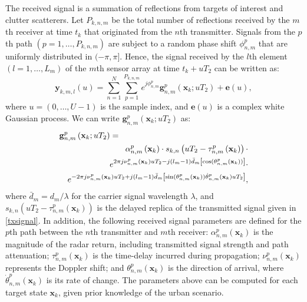 \documentclass[times]{asjcauth}
\begin{document}
The received signal is a summation of reflections from targets of interest and clutter scatterers. Let $P_{k,n,m}$ be the total number of reflections received by the $m$th receiver at time $t_{k}$ that originated from the $n$th transmitter. Signals from the $p$th path $(p = 1,\ldots,P_{k,n,m})$ are subject to a random phase shift $\phi_{n,m}^{p}$ that are uniformly distributed in $(-\pi,\pi]$. Hence, the signal received by the $l$th element $(l = 1,\ldots,L_{m})$ of the $m$th sensor array at time $t_{k} + uT_{2}$ can be written as:
\begin{equation}\label{rxsignal}
\mathbf{y}_{k,m,l}(u) = \sum_{n=1}^{N}\sum_{p =
1}^{P_{k,n,m}}e^{j\phi_{n,m}^{p}}\mathbf{g}_{n,m}^{p}\left(\mathbf{x}_{k};uT_{2}\right)
+\mathbf{e}(u),
\end{equation}
\noindent where $u = (0,\ldots,U-1)$ is the sample index, and $\mathbf{e}(u)$ is a complex white Gaussian process. We can write $\mathbf{g}_{n,m}^{p}\left(\mathbf{x}_{k};uT_{2}\right)$ as:
\begin{eqnarray}\label{eqng}
\lefteqn{\mathbf{g}_{n,m}^{p}\left(\mathbf{x}_{k};uT_{2}\right)=}\\ \nonumber
& &\alpha_{n,m}^{p}\left(\mathbf{x}_{k}\right)\cdot s_{k,n}\left(uT_{2} - \tau_{n,m}^{p}\left(\mathbf{x}_{k}\right)\right)\cdot \\ \nonumber
& &e^{2\pi
j\nu_{n,m}^{p}\left(\mathbf{x}_{k}\right)uT_{2}-j(l_{m}-1)\bar{d}_{m}\left[\cos(\theta_{n,m}^{p}\left(\mathbf{x}_{k}\right))\right]} \cdot\\ \nonumber
& &e^{-2\pi
j\nu_{n,m}^{p}\left(\mathbf{x}_{k}\right)uT_{2}+j(l_{m}-1)\bar{d}_{m}\left[\sin(\theta_{n,m}^{p}\left(\mathbf{x}_{k}\right))\dot{\theta}_{n,m}^{p}\left(\mathbf{x}_{k}\right)uT_{2}\right]},
\end{eqnarray}
\noindent where $\bar{d}_{m} = d_{m}/\lambda$ for the carrier signal wavelength $\lambda$, and $s_{k,n}\left(uT_{2} -
\tau_{n,m}^{p}\left(\mathbf{x}_{k}\right)\right)$ is the delayed replica of the transmitted signal given in \eqref{txsignal}. In addition, the following received signal parameters are defined for the $p$th path between the $n$th transmitter and $m$th receiver: $\alpha_{n,m}^{p}\left(\mathbf{x}_{k}\right)$ is the magnitude of the radar return, including transmitted signal strength and path attenuation; $\tau_{n,m}^{p}\left(\mathbf{x}_{k}\right)$ is the time-delay incurred during propagation; $\nu_{n,m}^{p}\left(\mathbf{x}_{k}\right)$ represents the Doppler shift; and $\theta_{n,m}^{p}\left(\mathbf{x}_{k}\right)$ is the direction of arrival, where $\dot{\theta}_{n,m}^{p}\left(\mathbf{x}_{k}\right)$ is its rate of change. The parameters above can be computed for each target state $\mathbf{x}_{k}$, given prior knowledge of the urban scenario.
\end{document}
